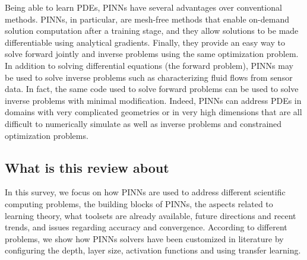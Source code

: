 \documentclass[pdflatex,sn-basic]{sn-jnl}%
\theoremstyle{thmstyleone}%
\theoremstyle{thmstyletwo}%
\theoremstyle{thmstylethree}%
\begin{document}
Being able to learn PDEs, PINNs have several advantages over conventional methods.
%
PINNs, in particular, are mesh-free methods that enable on-demand solution computation after a training stage, and they allow solutions to be made differentiable using analytical gradients.
Finally, they provide an easy way to solve forward jointly and inverse problems using the same optimization problem.
In addition to solving differential equations (the forward problem), PINNs may be used to solve inverse problems such as %
characterizing fluid flows from sensor data. 
%
In fact, the same code used to solve forward problems can be used to solve inverse problems with minimal modification. 
%
Indeed, PINNs can address PDEs in domains with very complicated geometries or in very high dimensions that are all difficult to numerically simulate as well as inverse problems and constrained optimization problems.
%





\subsection{What is this review about} 
In this survey, we focus on how PINNs are used to address different scientific computing problems, the building blocks of PINNs, the aspects related to learning theory, what toolsets are already available, future directions and recent trends, and issues regarding accuracy and convergence.
According to different problems, we show how PINNs solvers have been customized in literature by configuring the depth, layer size, activation functions and using transfer learning.
\end{document}
